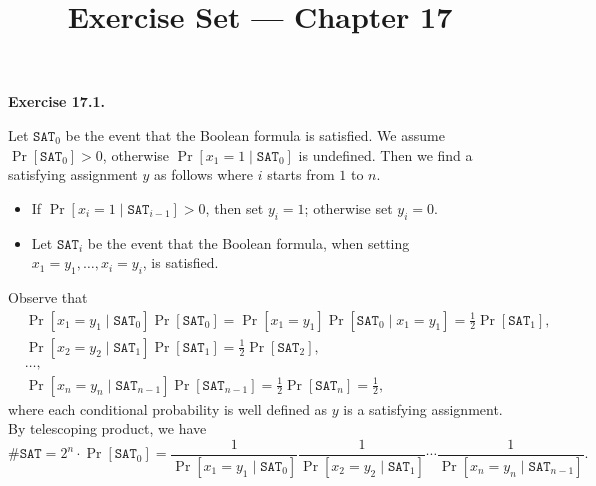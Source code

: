 \documentclass[a4paper]{article}
\title{Exercise Set --- Chapter 17}
\date{}
\newenvironment{exercise}[1]{
	\par
	\noindent\textbf{Exercise #1.}\quad
}{
	\par
	\bigskip
}
\newcommand{\sbra}[1]{\left[ #1 \right]}
\newcommand{\SAT}{\texttt{SAT}}
\begin{document}
    \maketitle

    \begin{exercise}{17.1}
        Let $\SAT_0$ be the event that the Boolean formula is satisfied.
        We assume $\Pr\sbra{\SAT_0}>0$, otherwise $\Pr\sbra{x_1=1\mid\SAT_0}$ is undefined.
        Then we find a satisfying assignment $y$ as follows where $i$ starts from $1$ to $n$.
        \begin{itemize}
            \item If $\Pr\sbra{x_i=1\mid\SAT_{i-1}}>0$, then set $y_i=1$; otherwise set $y_i=0$.
            \item Let $\SAT_i$ be the event that the Boolean formula, when setting $x_1=y_1,\ldots,x_i=y_i$, is satisfied.
        \end{itemize}
        Observe that 
        \begin{align*}
            &\Pr\sbra{x_1=y_1\mid\SAT_0}\Pr\sbra{\SAT_0}=\Pr\sbra{x_1=y_1}\Pr\sbra{\SAT_0\mid x_1=y_1}=\frac12\Pr\sbra{\SAT_1},\\
            &\Pr\sbra{x_2=y_2\mid\SAT_1}\Pr\sbra{\SAT_1}=\frac12\Pr\sbra{\SAT_2},\\
            &\ldots,\\
            &\Pr\sbra{x_n=y_n\mid\SAT_{n-1}}\Pr\sbra{\SAT_{n-1}}=\frac12\Pr\sbra{\SAT_n}=\frac12,
        \end{align*}
        where each conditional probability is well defined as $y$ is a satisfying assignment.
        By telescoping product, we have
        $$
        \#\SAT=2^n\cdot\Pr\sbra{\SAT_0}=\frac1{\Pr\sbra{x_1=y_1\mid\SAT_0}}\frac1{\Pr\sbra{x_2=y_2\mid\SAT_1}}\cdots\frac1{\Pr\sbra{x_n=y_n\mid\SAT_{n-1}}}.
        $$
    \end{exercise}
\end{document}
